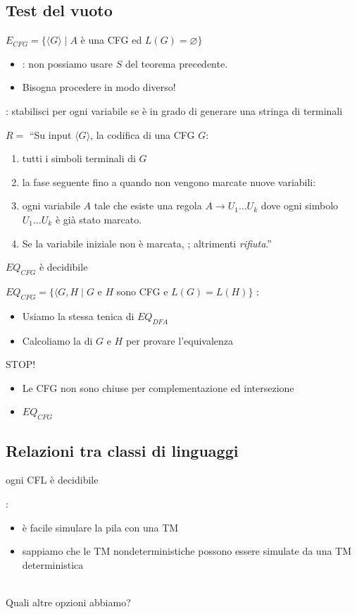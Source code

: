 \subsection{Test del vuoto}
$E_{CFG}=\{\langle G\rangle\mid A$ è una CFG ed $L(G)=\varnothing\}$ 
\begin{itemize}
	\item {}: non possiamo usare $S$ del teorema precedente. 
	\item Bisogna procedere in modo diverso!
\end{itemize}
: stabilisci per ogni variabile se è in grado di generare una stringa di terminali

$R=$ ``Su input $\langle G\rangle$, la codifica di una CFG $G$: 
\begin{enumerate}
	\item {} tutti i simboli terminali di $G$
	\item {} la fase seguente fino a quando non vengono marcate nuove variabili: 
	\item {} ogni variabile $A$ tale che esiste una regola $A\rightarrow U_1\dots U_k$ dove ogni simbolo $U_1\dots U_k$ è già stato marcato. 
	\item Se la variabile iniziale non è marcata, ; altrimenti \textit{rifiuta}.''
\end{enumerate}

\begin{theorem}
	$EQ_{CFG}$ è decidibile
\end{theorem}
$EQ_{CFG} = \{\langle G,H\mid G$ e $H$ sono CFG e $L(G)= L(H)\}$ 
:
\begin{itemize}
	\item Usiamo la stessa tenica di $EQ_{DFA}$ 
	\item Calcoliamo la  di $G$ e $H$ per provare l'equivalenza
\end{itemize}

\begin{center}
	{\Large STOP!}
\end{center}
\begin{itemize}
	\item Le CFG non sono chiuse per complementazione ed intersezione
	\item $EQ_{CFG}$ 
\end{itemize}

\subsection{Relazioni tra classi di linguaggi}
\begin{theorem}
	ogni CFL è decidibile
\end{theorem}
:
\begin{itemize}
	\item è facile simulare la pila con una TM
	\item sappiamo che le TM nondeterministiche possono essere simulate da una TM deterministica
\end{itemize}
\\
Quali altre opzioni abbiamo? 

